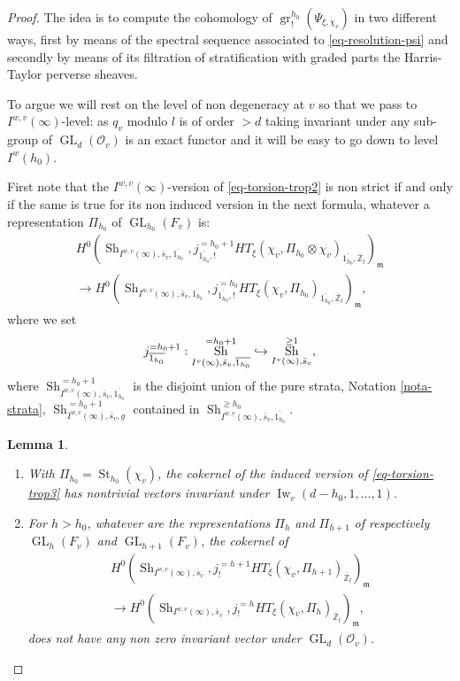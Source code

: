 \documentclass[JEP,XML,SOM,Unicode,published]{cedram}
\newenvironment{enumeratei}
{\bgroup\def\theenumi{\roman{enumi}}\def\theenumii{\arabic{enumii}}\begin{enumerate}}
{\end{enumerate}\egroup}
\def\hto{\mathrel{\lhook\joinrel\to}}
\DeclareMathOperator{\GL}{GL}
\theoremstyle{plain}
\newtheorem{lemma}[equation]{Lemma}
\theoremstyle{definition}
\numberwithin{equation}{subsection}
\newcommand\Zm{{\mathbb Z}}
\newcommand\OC{{\mathcal O}}
\DeclareMathOperator{\sh}{Sh}
\DeclareMathOperator{\Iw}{Iw}
\DeclareMathOperator{\st}{St}
\DeclareMathOperator{\gr}{gr}
\let \oo=\infty
\begin{document}
\begin{proof}
The idea is to compute the cohomology of $\gr^{h_0}_{!}(\Psi_{\xi,\chi_v})$
in two different ways, first by means of the spectral sequence associated to
\eqref{eq-resolution-psi} and secondly by means of its filtration of stratification with graded parts the Harris-Taylor perverse sheaves.

To argue we will rest on the level of non degeneracy at $v$ so that we pass to
$I^{w,v}(\oo)$-level: as $q_v$ modulo $l$ is of order $>d$ taking
invariant under any sub-group of $\GL_d(\OC_v)$ is an exact functor and it
will be easy to go down to level $I^w(h_0)$.

First note that the $I^{w,v}(\oo)$-version of
\eqref{eq-torsion-trop2} is non strict
if and only if the same is true for its non induced version in the next formula,
whatever a representation $\Pi_{h_0}$ of $\GL_{h_0}(F_v)$ is:\vspace*{-3pt}
\begin{multline} \label{eq-torsion-trop3}
H^{0}(\sh_{I^{w,v}(\oo),\bar s_v,\overline{1_{h_0}}},j^{=h_0+1}_{\overline{1_{h_0}},!} HT_{\xi}
(\chi_v,\Pi_{h_0} \otimes \chi_v)_{\overline{1_{h_0}},\overline \Zm_l})_{\mathfrak m} \\
\to H^0(\sh_{I^{w,v}(\oo),\bar s_v,\overline{1_{h_0}}},j^{=h_0}_{\overline{1_{h_0}},!}
HT_{\xi}(\chi_v,\Pi_{h_0})_{\overline{1_{h_0}},\overline \Zm_l})_{\mathfrak m},
\end{multline}
where we set
\[
j^{=h_0+1}_{\overline{1_{h_0}}}:
\sh^{=h_0+1}_{I^v(\oo),\bar s_v,\overline{1_{h_0}}}
\hto \sh^{\geq 1}_{I^v(\oo),\bar s_v},
\]
where $\sh^{=h_0+1}_{I^{w,v}(\oo),\bar s_v,\overline{1_{h_0}}}$ is the
disjoint union of the pure strata, \cf Notation \ref{nota-strata},
$\sh^{=h_0+1}_{I^{w,v}(\oo),\bar s_v,g}$
contained in $\sh^{\geq h_0}_{I^{w,v}(\oo),\bar s_v,\overline{1_{h_0}}}$.

\skpt
\begin{lemma} \label{lem-facts0}
\begin{enumeratei}
\item\label{lem-facts0i} With $\Pi_{h_0}=\st_{h_0}(\chi_v)$, the cokernel of the induced version of
\eqref{eq-torsion-trop3} has nontrivial vectors invariant
under $\Iw_v(d-h_0,1,\dots,1)$.

\item\label{lem-facts0ii} For $h > h_0$, whatever are the representations $\Pi_h$ and
$\Pi_{h+1}$ of respectively $\GL_h(F_v)$ and $\GL_{h+1}(F_v)$, the cokernel of
\begin{multline} \label{eq-torsion-trop-h}
H^{0}(\sh_{I^{w,v}(\oo),\bar s_v},j^{=h+1}_!
HT_\xi(\chi_v,\Pi_{h+1})_{\overline \Zm_l})_{\mathfrak m} \\
\to H^0(\sh_{I^{w,v}(\oo),\bar s_v},j^{=h}_!
HT_\xi(\chi_v,\Pi_h)_{\overline \Zm_l})_{\mathfrak m},
\end{multline}
does not have any non zero invariant vector under $\GL_d(\OC_v)$.


\end{enumeratei}
\end{lemma}
\end{proof}
\end{document}
